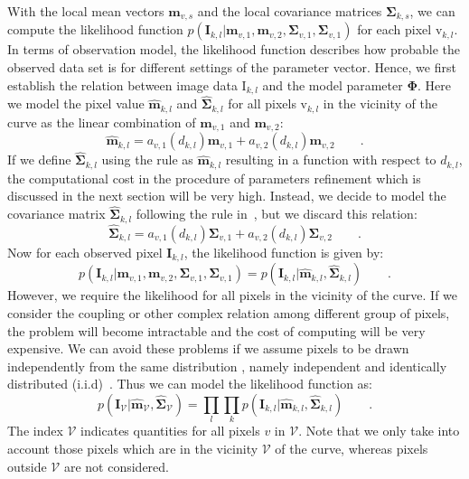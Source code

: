 \documentclass[conference]{IEEEtran}
\begin{document}
With the local mean vectors $\mathbf{m}_{v,s}$  and the local covariance matrices
$\mathbf{\Sigma}_{k,s}$, we can compute the
likelihood function   $p(\mathbf{I}_{k,l} | \mathbf{m}_{v,1}, \mathbf{m}_{v,2},
  \mathbf{\Sigma}_{v,1}, \mathbf{\Sigma}_{v,1})$ for each pixel
  $\mathrm{v}_{k,l}$. In terms of observation model, the likelihood
  function describes how probable the observed data set is for
  different settings of the parameter vector. Hence, we first establish
  the relation between image data $\mathrm{I}_{k,l}$ and the model
  parameter $\mathbf{\Phi}$. Here we model the pixel value
  $\hat{\mathbf{m}}_{k,l}$ and $\hat{\mathbf{\Sigma}}_{k,l}$
  for all pixels $\mathrm{v}_{k,l}$ in the vicinity of the curve as the
  linear combination of $\mathbf{m}_{v,1}$ and $\mathbf{m}_{v,2}$:
  \begin{equation}
    \label{eq:meankl}
    \hat{\mathbf{m}}_{k,l} = a_{v,1}(d_{k,l})\mathbf{m}_{v,1} + a_{v,2}(d_{k,l})\mathbf{m}_{v,2}\qquad.
  \end{equation}
If we define  $\hat{\mathbf{\Sigma}}_{k,l}$ using the rule as
$\hat{\mathbf{m}}_{k,l}$ resulting in a function with respect to $d_{k,l}$, the computational cost in the procedure of
parameters refinement which is discussed in the next section  will be very high. Instead, we decide to
model the covariance matrix $\hat{\mathbf{\Sigma}}_{k,l}$ following the
rule in~\cite{hanek2004fitting}, but we discard this relation:
\begin{equation}
  \label{eq:sigmakl}
  \hat{\mathbf{\mathbf{\Sigma}}}_{k,l} = a_{v,1}(d_{k,l})\mathbf{\Sigma}_{v,1} + a_{v,2}(d_{k,l})\mathbf{\Sigma}_{v,2}\qquad.
\end{equation}
Now for each observed pixel $\mathbf{I}_{k,l}$, the likelihood
function is given by:
\begin{equation}
  \label{eq:likelihood}
p(\mathbf{I}_{k,l} | \mathbf{m}_{v,1}, \mathbf{m}_{v,2},
  \mathbf{\Sigma}_{v,1}, \mathbf{\Sigma}_{v,1}) = p(\mathbf{I}_{k,l} | \hat{\mathbf{\mathbf{m}}}_{k,l},\hat{\mathbf{\mathbf{\Sigma}}}_{k,l}) \qquad.
\end{equation}
However, we require the likelihood for all pixels in the vicinity of
the curve. If we consider the coupling or other complex relation among
different group of pixels, the problem will become intractable and the cost of computing will be very expensive. We can
avoid these problems if we assume pixels to be drawn independently from the same distribution
, namely independent and identically distributed
(i.i.d)~\cite{bishop2006pattern}. Thus we can model the likelihood function as:
\begin{equation}
  \label{eq:liklihoodall}
  p(\mathbf{I}_{\mathcal{V}} |
  \hat{\mathbf{\mathbf{m}}}_{\mathcal{V}},\hat{\mathbf{\mathbf{\Sigma}}}_{\mathcal{V}})
  = \prod_l \prod_k p(\mathbf{I}_{k,l} | \hat{\mathbf{\mathbf{m}}}_{k,l},\hat{\mathbf{\mathbf{\Sigma}}}_{k,l}) \qquad.
\end{equation}
The index $\mathcal{V}$ indicates quantities for all pixels $v$ in
$\mathcal{V}$. Note that we only take into account those pixels which are
in the vicinity $\mathcal{V}$ of the curve, whereas pixels outside
$\mathcal{V}$ are not considered.
\end{document}
